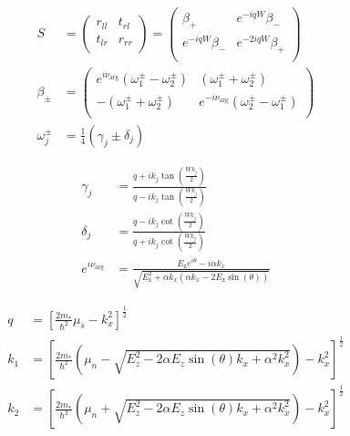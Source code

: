 \documentclass[english, twocolumn, 10pt, aps, superscriptaddress, floatfix, prb, citeautoscript]{revtex4-1}
\begin{document}
\begin{align}
\label{eq:smatrix}
    S &= \left(
    \begin{array}{rr}
    r_{ll}&t_{rl}\\
    t_{lr}&r_{rr}\\
    \end{array}
    \right) =
    \left(
    \begin{array}{rr}
    \beta_+ & e^{-i q W} \beta_-\\
    e^{-i q W} \beta_- & e^{-2 i q W} \beta_+\\
    \end{array}
    \right)
    \\
    \beta_\pm &= \left(
    \begin{array}{rr}
    e^{i \nu_{\arg}}\left(\omega^\pm_1 - \omega^\pm_2\right) & (\omega^\pm _1 + \omega^\pm _2)\\
    -(\omega^\pm _1 + \omega^\pm _2) & e^{-i \nu _{\arg }} \left(\omega^\pm _2 - \omega^\pm _1\right)\\
    \end{array}
    \right)\\
    \omega^\pm_j &= \frac{1}{4} \left(\gamma _{j} \pm \delta _{j}\right)
\end{align}

\begin{align}
    \gamma_j &= \frac{q+i k_{j} \tan \left(\frac{W k_{j}}{2}\right)}{q-i k_{j} \tan \left(\frac{W k_{j}}{2}\right)} \\
    \delta_j &= \frac{q-i k_{j} \cot \left(\frac{W k_{j}}{2}\right)}{q+i k_{j} \cot \left(\frac{W k_{j}}{2}\right)}\\
    e^{i \nu_{\arg}} &= \frac{E_\text{z} e^{i \theta }-i \alpha  k_x}{\sqrt{E_\text{z}^2+\alpha  k_x \left(\alpha  k_x-2 E_\text{z} \sin (\theta )\right)}}
\end{align}

\begin{footnotesize}
\begin{align}
    q &= \left[ \frac{2 m_\ast}{\hbar ^2}\mu_s - k_x^2 \right]^\frac{1}{2}\\
    k_1 &= \left[ \frac{2 m_\ast}{\hbar^2} \left(\mu_n-\sqrt{E_z^2-2 \alpha  E_z \sin (\theta ) k_x+\alpha ^2 k_x^2}\right) - k_x^2 \right]^\frac{1}{2}\\
    k_2 &= \left[ \frac{2 m_\ast}{\hbar^2} \left(\mu_n+\sqrt{E_z^2-2 \alpha  E_z \sin (\theta ) k_x+\alpha ^2 k_x^2}\right) - k_x^2 \right]^\frac{1}{2}
\label{eq:momenta_short_junction}
\end{align}
\end{footnotesize}
\end{document}
